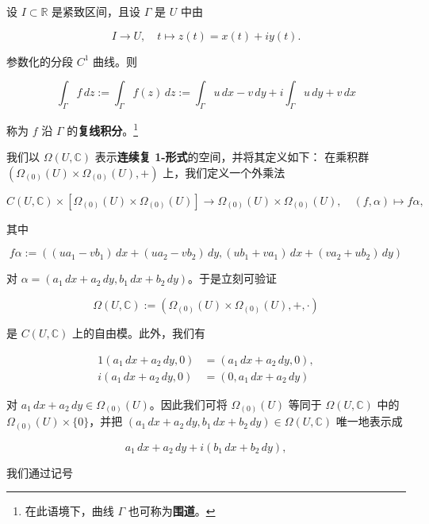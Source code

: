 设 $ I \subset \mathbb{R} $ 是紧致区间，且设 $ \Gamma $ 是 $ U $ 中由

\[
I \to U , \quad t \mapsto z(t) = x(t) + iy(t) .
\]

参数化的分段 $ C^{1} $ 曲线。则

\[
\int_{\Gamma} f\,dz := \int_{\Gamma} f(z)\,dz := \int_{\Gamma} u\,dx - v\,dy + i\int_{\Gamma} u\,dy + v\,dx
\]

称为 $ f $ 沿 $ \Gamma $ 的\textbf{复线积分}。\footnote{在此语境下，曲线 $ \Gamma $ 也可称为\textbf{围道}。}

\begin{remark}

\begin{items}
\item

我们以 $ \Omega(U,\mathbb{C}) $ 表示\textbf{连续复 1-形式}的空间，并将其定义如下：
在乘积群 $ (\Omega_{(0)}(U)\times\Omega_{(0)}(U),+) $ 上，我们定义一个外乘法

\[
C(U,\mathbb{C})\times\left[\Omega_{(0)}(U)\times\Omega_{(0)}(U)\right] \to \Omega_{(0)}(U)\times\Omega_{(0)}(U) , \quad (f,\alpha) \mapsto f\alpha ,
\]

其中

\[
f\alpha := \left((ua_{1} - vb_{1})\,dx + (ua_{2} - vb_{2})\,dy, (ub_{1} + va_{1})\,dx + (va_{2} + ub_{2})\,dy\right)
\]

对 $ \alpha = (a_{1}\,dx + a_{2}\,dy, b_{1}\,dx + b_{2}\,dy) $。于是立刻可验证

\[
\Omega(U,\mathbb{C}) := (\Omega_{(0)}(U)\times\Omega_{(0)}(U),+,\cdot)
\]

是 $ C(U,\mathbb{C}) $ 上的自由模。此外，我们有

\begin{equation*}
\begin{aligned}
1(a_{1}\,dx + a_{2}\,dy,0) &= (a_{1}\,dx + a_{2}\,dy,0) , \\ i(a_{1}\,dx + a_{2}\,dy,0) &= (0, a_{1}\,dx + a_{2}\,dy)
\end{aligned}
\end{equation*}

对 $ a_{1}\,dx + a_{2}\,dy \in \Omega_{(0)}(U) $。因此我们可将 $ \Omega_{(0)}(U) $ 等同于 $ \Omega(U,\mathbb{C}) $ 中的 $ \Omega_{(0)}(U)\times\{0\} $，并把 $ (a_{1}\,dx + a_{2}\,dy, b_{1}\,dx + b_{2}\,dy) \in \Omega(U,\mathbb{C}) $ 唯一地表示成

\[
a_{1}\,dx + a_{2}\,dy + i(b_{1}\,dx + b_{2}\,dy) ,
\]

我们通过记号


\end{items}
\end{remark}
